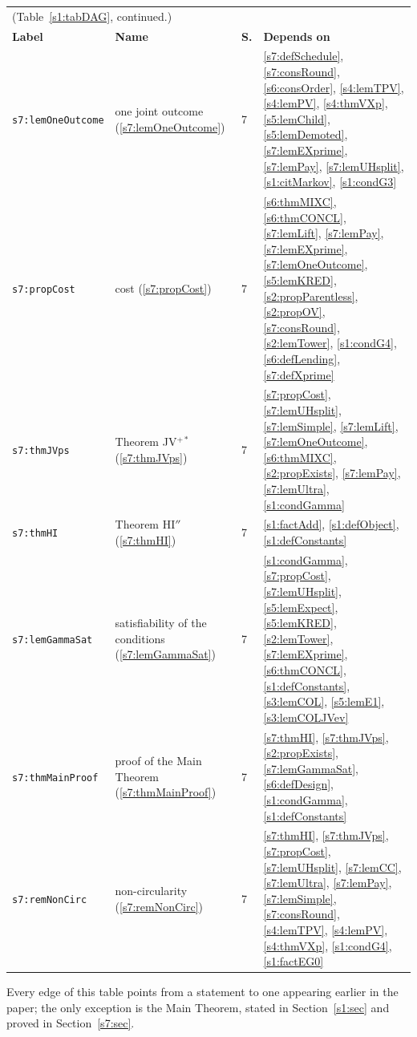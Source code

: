\begin{center}
{\footnotesize
\setlength{\tabcolsep}{3pt}
\begin{tabular}{p{3.2cm}p{3.6cm}p{0.5cm}p{7.6cm}}
\multicolumn{4}{l}{(Table~\ref{s1:tabDAG}, continued.)}\\
\textbf{Label} & \textbf{Name} & \textbf{S.} & \textbf{Depends on}\\
\hline
\texttt{s7:lemOneOutcome} & one joint outcome (\ref{s7:lemOneOutcome}) & 7 & \ref{s7:defSchedule}, \ref{s7:consRound}, \ref{s6:consOrder}, \ref{s4:lemTPV}, \ref{s4:lemPV}, \ref{s4:thmVXp}, \ref{s5:lemChild}, \ref{s5:lemDemoted}, \ref{s7:lemEXprime}, \ref{s7:lemPay}, \ref{s7:lemUHsplit}, \ref{s1:citMarkov}, \ref{s1:condG3}\\
\texttt{s7:propCost} & cost (\ref{s7:propCost}) & 7 & \ref{s6:thmMIXC}, \ref{s6:thmCONCL}, \ref{s7:lemLift}, \ref{s7:lemPay}, \ref{s7:lemEXprime}, \ref{s7:lemOneOutcome}, \ref{s5:lemKRED}, \ref{s2:propParentless}, \ref{s2:propOV}, \ref{s7:consRound}, \ref{s2:lemTower}, \ref{s1:condG4}, \ref{s6:defLending}, \ref{s7:defXprime}\\
\texttt{s7:thmJVps} & Theorem JV$^{+*}$ (\ref{s7:thmJVps}) & 7 & \ref{s7:propCost}, \ref{s7:lemUHsplit}, \ref{s7:lemSimple}, \ref{s7:lemLift}, \ref{s7:lemOneOutcome}, \ref{s6:thmMIXC}, \ref{s2:propExists}, \ref{s7:lemPay}, \ref{s7:lemUltra}, \ref{s1:condGamma}\\
\texttt{s7:thmHI} & Theorem HI$''$ (\ref{s7:thmHI}) & 7 & \ref{s1:factAdd}, \ref{s1:defObject}, \ref{s1:defConstants}\\
\texttt{s7:lemGammaSat} & satisfiability of the conditions (\ref{s7:lemGammaSat}) & 7 & \ref{s1:condGamma}, \ref{s7:propCost}, \ref{s7:lemUHsplit}, \ref{s5:lemExpect}, \ref{s5:lemKRED}, \ref{s2:lemTower}, \ref{s7:lemEXprime}, \ref{s6:thmCONCL}, \ref{s1:defConstants}, \ref{s3:lemCOL}, \ref{s5:lemE1}, \ref{s3:lemCOLJVev}\\
\texttt{s7:thmMainProof} & proof of the Main Theorem (\ref{s7:thmMainProof}) & 7 & \ref{s7:thmHI}, \ref{s7:thmJVps}, \ref{s2:propExists}, \ref{s7:lemGammaSat}, \ref{s6:defDesign}, \ref{s1:condGamma}, \ref{s1:defConstants}\\
\texttt{s7:remNonCirc} & non-circularity (\ref{s7:remNonCirc}) & 7 & \ref{s7:thmHI}, \ref{s7:thmJVps}, \ref{s7:propCost}, \ref{s7:lemUHsplit}, \ref{s7:lemCC}, \ref{s7:lemUltra}, \ref{s7:lemPay}, \ref{s7:lemSimple}, \ref{s7:consRound}, \ref{s4:lemTPV}, \ref{s4:lemPV}, \ref{s4:thmVXp}, \ref{s1:condG4}, \ref{s1:factEG0}\\
\hline
\end{tabular}}
\end{center}

Every edge of this table points from a statement to one appearing earlier in the
paper; the only exception is the Main Theorem, stated in
Section~\ref{s1:sec} and proved in Section~\ref{s7:sec}.
